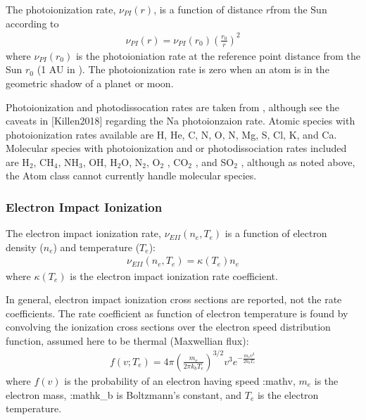 \documentclass[letterpaper,10pt,english]{sphinxmanual}
\begin{document}
\sphinxAtStartPar
The photoionization rate, \(\nu_{PI}(r)\), is a function of distance
\(r\)from the Sun according to
\begin{equation*}
\begin{split}\nu_{PI}(r) = \nu_{PI}(r_0) \left(\frac{r_0}{r}\right)^2\end{split}
\end{equation*}
\sphinxAtStartPar
where \(\nu_{PI}(r_0)\) is the photoioniation rate at the reference point
distance from the Sun \(r_0\) (1 AU in ). The photoionization
rate is zero when an atom is in the geometric shadow of a planet or moon.

\sphinxAtStartPar
Photoionization and photodissocation rates are taken from ,
although see the caveats in {[}Killen2018{]} regarding the Na photoionzaion rate.
Atomic species with photoionization rates available are H, He, C, N, O, N, Mg,
S, Cl, K, and Ca. Molecular species with photoionization and or photodissociation
rates included are H$_{\text{2}}$, CH$_{\text{4}}$, NH$_{\text{3}}$, OH, H$_{\text{2}}$O,
N$_{\text{2}}$, O$_{\text{2}}$ , CO$_{\text{2}}$ , and SO$_{\text{2}}$ , although as
noted above, the Atom class cannot currently handle molecular species.


\subsubsection{Electron Impact Ionization}
\label{\detokenize{nexoclom2/atomicdata:electron-impact-ionization}}\label{\detokenize{nexoclom2/atomicdata:eimp-ionization}}
\sphinxAtStartPar
The electron impact ionization rate, \(\nu_{EII}(n_e, T_e)\) is a function
of electron density (\(n_e\)) and temperature (\(T_e\)):
\begin{equation*}
\begin{split}\nu_{EII}(n_e, T_e) = \kappa(T_e) n_e\end{split}
\end{equation*}
\sphinxAtStartPar
where \(\kappa(T_e)\) is the electron impact ionization rate coefficient.

\sphinxAtStartPar
In general, electron impact ionization cross sections are reported, not the
rate coefficients. The rate coefficient as function of electron temperature
is found by
convolving the ionization cross sections over the electron speed distribution
function, assumed here to be thermal (Maxwellian flux):
\begin{equation*}
\begin{split}f(v; T_e) = 4 \pi \left(\frac{m_e}{2\pi k_b T_e}\right)^{3/2} v^3
    e^{-\frac{m_e v^2}{2 k_b T_e}}\end{split}
\end{equation*}
\sphinxAtStartPar
where \(f(v)\) is the probability of an electron having speed
:math\textasciigrave{}v\textasciigrave{}, \(m_e\) is the electron mass, :math\textasciigrave{}k\_b\textasciigrave{} is
Boltzmann’s constant, and \(T_e\) is the electron temperature.
\end{document}
